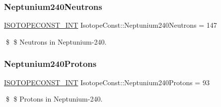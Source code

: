 \subsubsection{\texorpdfstring{Neptunium240\+Neutrons}{Neptunium240Neutrons}}
{\footnotesize\ttfamily \mbox{\hyperlink{group___isotope_const-_macros_ga5f18360b3e99483a35c32d789e62621c}{I\+S\+O\+T\+O\+P\+E\+C\+O\+N\+S\+T\+\_\+\+I\+NT}} Isotope\+Const\+::\+Neptunium240\+Neutrons = 147}

\$ \$ Neutrons in Neptunium-\/240. \mbox{\label{group___isotope_const-_neptunium-_np240_ga18f1bcba6db6a9868fe80373c26e1ce2}} 
\subsubsection{\texorpdfstring{Neptunium240\+Protons}{Neptunium240Protons}}
{\footnotesize\ttfamily \mbox{\hyperlink{group___isotope_const-_macros_ga5f18360b3e99483a35c32d789e62621c}{I\+S\+O\+T\+O\+P\+E\+C\+O\+N\+S\+T\+\_\+\+I\+NT}} Isotope\+Const\+::\+Neptunium240\+Protons = 93}

\$ \$ Protons in Neptunium-\/240. 